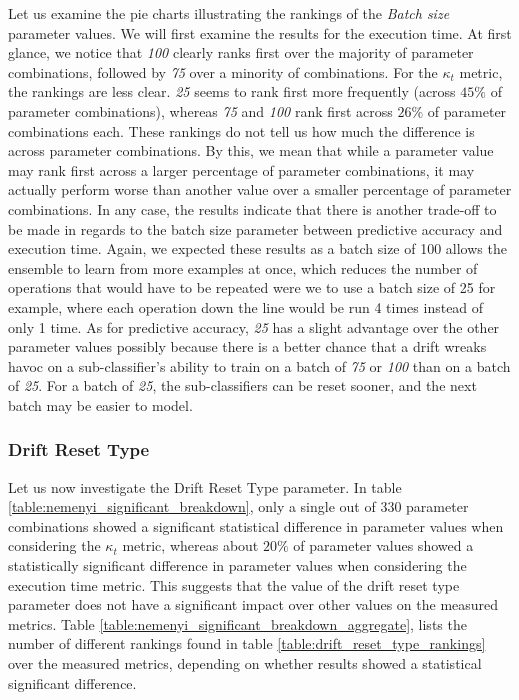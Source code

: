 Let us examine the pie charts illustrating the rankings of the \textit{Batch size} parameter values.
We will first examine the results for the execution time. At first glance, we notice that \textit{100} clearly ranks first over the majority of parameter combinations, followed by \textit{75} over a minority of combinations.
For the $\kappa_t$ metric, the rankings are less clear. \textit{25} seems to rank first more frequently (across $45\%$ of parameter combinations), whereas \textit{75} and \textit{100} rank first across $26\%$ of parameter combinations each. These rankings do not tell us how much the difference is across parameter combinations. By this, we mean that while a parameter value may rank first across a larger percentage of parameter combinations, it may actually perform worse than another value over a smaller percentage of parameter combinations.
In any case, the results indicate that there is another trade-off to be made in regards to the batch size parameter between predictive accuracy and execution time. Again, we expected these results as a batch size of 100 allows the ensemble to learn from more examples at once, which reduces the number of operations that would have to be repeated were we to use a batch size of 25 for example, where each operation down the line would be run 4 times instead of only 1 time. As for predictive accuracy, \textit{25} has a slight advantage over the other parameter values possibly because there is a better chance that a drift wreaks havoc on a sub-classifier's ability to train on a batch of \textit{75} or \textit{100} than on a batch of \textit{25}. For a batch of \textit{25}, the sub-classifiers can be reset sooner, and the next batch may be easier to model.

\subsubsection{Drift Reset Type}

Let us now investigate the Drift Reset Type parameter. In table \ref{table:nemenyi_significant_breakdown}, only a single out of 330 parameter combinations showed a significant statistical difference in parameter values when considering the $\kappa_t$ metric, whereas about $20\%$ of parameter values showed a statistically significant difference in parameter values when considering the execution time metric. This suggests that the value of the drift reset type parameter does not have a significant impact over other values on the measured metrics.
Table \ref{table:nemenyi_significant_breakdown_aggregate}, lists the number of different rankings found in table \ref{table:drift_reset_type_rankings} over the measured metrics, depending on whether results showed a statistical significant difference.

